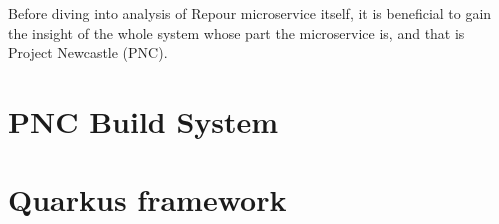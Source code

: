 \documentclass[../../main.tex]{subfiles}
\begin{document}
Before diving into analysis of Repour microservice itself, it is beneficial to gain the insight of the whole system whose part the microservice is, and that is Project Newcastle (PNC).

\section{PNC Build System}


\section{Quarkus framework}

\end{document}
